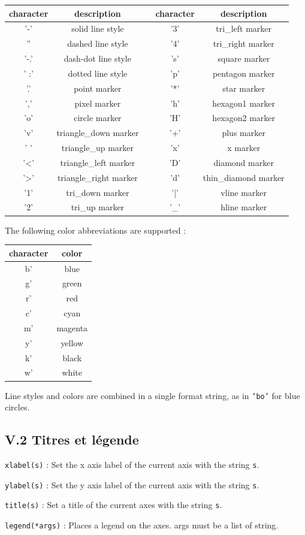 \documentclass[10pt,fleqn]{article} %
\begin{document}
\hfil
\begin{tabular}{|cc|c|cc|}
\hline
character &description & \quad &  character & description \\
\hline
'-' &  solid line style & & '3' &  tri\_left marker\\
'' &  dashed line style & &  '4' &  tri\_right marker\\
'-.' &  dash-dot line style & & 's' &  square marker\\
' :' &  dotted line style & & 'p' &  pentagon marker\\
'.' &  point marker & & '*' &  star marker\\
',' &  pixel marker & & 'h' &  hexagon1 marker\\
'o' &  circle marker & & 'H' &  hexagon2 marker\\
'v' &  triangle\_down marker & & '+' &  plus marker\\
' ' &  triangle\_up marker & & 'x' &  x marker\\
'<' &  triangle\_left marker & & 'D' &  diamond marker\\
'>' &  triangle\_right marker & & 'd' &  thin\_diamond marker\\
'1' &  tri\_down marker & & '|' &  vline marker\\
'2' &  tri\_up marker & & '\_' &  hline marker \\
\hline
\end{tabular}

The following color abbreviations are supported :

\hfil
\begin{tabular}{|cc|}
\hline
character & color\\
\hline
b' &  blue \\
g' & green \\
r' & red \\
c' & cyan \\
m' & magenta \\
y'  & yellow \\
k'  & black \\
w'  & white \\
\hline
\end{tabular}


Line styles and colors are combined in a single format string, as in {\tt 'bo'} for blue circles.


\subsection*{V.2 \quad  Titres et l\'egende}

{\tt xlabel(s)} : Set the x axis label of the current axis with the string {\tt s}.

{\tt ylabel(s)} : Set the y axis label of the current axis with the string {\tt s}.

{\tt title(s)} : Set a title of the current axes with the string {\tt s}.

{\tt legend(*args)} : Places a legend on the axes. args must be a list of string.
\end{document}
